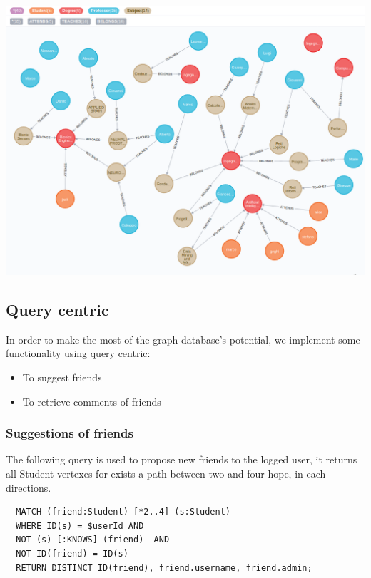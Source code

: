 \documentclass[a4paper]{article}
\begin{document}
\begin{minipage}{\linewidth}
\begin{center}
\vspace{4mm}
\includegraphics[width = 1\textwidth]{./images/diagrams/graphDb.png} 
\vspace{2mm}
\label{fig:analisys_diagram}
\end{center}
\end{minipage}

\subsection{Query centric}
In order to make the most of the graph database's potential, we implement some functionality using query centric:
\begin{itemize}
\item To suggest friends
\item To retrieve comments of friends
\end{itemize}

\subsubsection{Suggestions of friends}
The following query is used to propose new friends to the logged user, it returns all Student vertexes for exists a path between two and four hope, in each directions. 
\begin{verbatim}
  MATCH (friend:Student)-[*2..4]-(s:Student) 
  WHERE ID(s) = $userId AND  
  NOT (s)-[:KNOWS]-(friend)  AND
  NOT ID(friend) = ID(s) 
  RETURN DISTINCT ID(friend), friend.username, friend.admin;
\end{verbatim}
\end{document}
